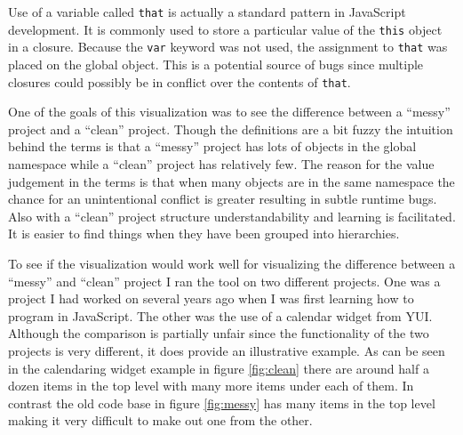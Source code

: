 \documentclass[]{article}
\begin{document}
Use of a variable called {\tt that} is actually a standard pattern in JavaScript development. It is commonly used to store a particular value of the {\tt this} object in a closure. Because the {\tt var} keyword was not used, the assignment to {\tt that} was placed on the global object. This is a potential source of bugs since multiple closures could possibly be in conflict over the contents of {\tt that}.


One of the goals of this visualization was to see the difference between a ``messy'' project and a ``clean'' project. Though the definitions are a bit fuzzy the intuition behind the terms is that a ``messy'' project has lots of objects in the global namespace while a ``clean'' project has relatively few. The reason for the value judgement in the terms is that when many objects are in the same namespace the chance for an unintentional conflict is greater resulting in subtle runtime bugs. Also with a ``clean'' project structure understandability and learning is facilitated. It is easier to find things when they have been grouped into hierarchies.


To see if the visualization would work well for visualizing the difference between a ``messy'' and ``clean'' project I ran the tool on two different projects. One was a project I had worked on several years ago when I was first learning how to program in JavaScript. The other was the use of a calendar widget from YUI. Although the comparison is partially unfair since the functionality of the two projects is very different, it does provide an illustrative example. As can be seen in the calendaring widget example in figure \ref{fig:clean} there are around half a dozen items in the top level with many more items under each of them. In contrast the old code base in figure \ref{fig:messy} has many items in the top level making it very difficult to make out one from the other.



\end{document}
